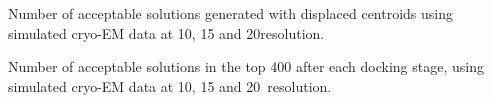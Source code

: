 \caption{}
{Number of acceptable solutions generated with displaced centroids
using simulated cryo-EM data at 10, 15 and 20\Angstrom resolution.}
\stopbuffer


\stopbuffer



\caption{}
{Number of acceptable solutions in the top 400 after each docking stage, using
simulated cryo-EM data at 10, 15 and 20\Angstrom\ resolution.}
\stopbuffer



\stopbuffer
